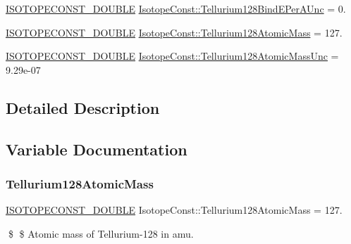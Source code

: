 \begin{DoxyCompactItemize}
\mbox{\hyperlink{group___isotope_const-_macros_ga8f45a7272ce02c0b4c65c44636ed719a}{I\+S\+O\+T\+O\+P\+E\+C\+O\+N\+S\+T\+\_\+\+D\+O\+U\+B\+LE}} \mbox{\hyperlink{group___isotope_const-_tellurium-_te128_gab43fba3419dfeff412107006d68136fc}{Isotope\+Const\+::\+Tellurium128\+Bind\+E\+Per\+A\+Unc}} = 0.
\item 
\mbox{\hyperlink{group___isotope_const-_macros_ga8f45a7272ce02c0b4c65c44636ed719a}{I\+S\+O\+T\+O\+P\+E\+C\+O\+N\+S\+T\+\_\+\+D\+O\+U\+B\+LE}} \mbox{\hyperlink{group___isotope_const-_tellurium-_te128_gacb3834ab7e8ccd25b88928213bbf3bbc}{Isotope\+Const\+::\+Tellurium128\+Atomic\+Mass}} = 127.
\item 
\mbox{\hyperlink{group___isotope_const-_macros_ga8f45a7272ce02c0b4c65c44636ed719a}{I\+S\+O\+T\+O\+P\+E\+C\+O\+N\+S\+T\+\_\+\+D\+O\+U\+B\+LE}} \mbox{\hyperlink{group___isotope_const-_tellurium-_te128_gabbc4bf3be626f8e612ebd846fe7b6376}{Isotope\+Const\+::\+Tellurium128\+Atomic\+Mass\+Unc}} = 9.\+29e-\/07
\end{DoxyCompactItemize}


\subsection{Detailed Description}


\subsection{Variable Documentation}
\mbox{\label{group___isotope_const-_tellurium-_te128_gacb3834ab7e8ccd25b88928213bbf3bbc}} 
\subsubsection{\texorpdfstring{Tellurium128\+Atomic\+Mass}{Tellurium128AtomicMass}}
{\footnotesize\ttfamily \mbox{\hyperlink{group___isotope_const-_macros_ga8f45a7272ce02c0b4c65c44636ed719a}{I\+S\+O\+T\+O\+P\+E\+C\+O\+N\+S\+T\+\_\+\+D\+O\+U\+B\+LE}} Isotope\+Const\+::\+Tellurium128\+Atomic\+Mass = 127.}

\$ \$ Atomic mass of Tellurium-\/128 in amu. \mbox{\label{group___isotope_const-_tellurium-_te128_gabbc4bf3be626f8e612ebd846fe7b6376}} 
